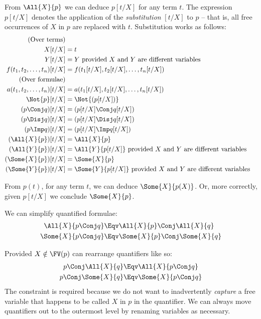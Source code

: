 \begin{itemize}
From $\All{X}{p}$ we can deduce $p[t/X]$ for any term $t$.  The
expression $p[t/X]$ denotes the application of the \emph{substitution}
$[t/X]$ to $p$ -- that is, all free occurrences of $X$ in $p$ are
replaced with $t$.  Substitution works as follows:
\begin{align*}
\text{(Over terms)} \\
X[t/X]
& = t \\
Y[t/X]
& = Y \text{ provided $X$ and $Y$ are different variables} \\
f(t_1, t_2, \ldots, t_n)[t/X]
& = f(t_1[t/X], t_2[t/X], \ldots, t_n[t/X]) \\
\text{(Over formulae)} \\
a(t_1, t_2, \ldots, t_n)[t/X]
& = a(t_1[t/X], t_2[t/X], \ldots, t_n[t/X]) \\
\Not{p}[t/X]
& = \Not{(p[t/X])} \\
(p \Conj q)[t/X]
& = (p[t/X] \Conj q[t/X]) \\
(p \Disj q)[t/X]
& = (p[t/X] \Disj q[t/X]) \\
(p \Imp q)[t/X]
& = (p[t/X] \Imp q[t/X]) \\
(\All{X}{p})[t/X]
& = \All{X}{p} \\
(\All{Y}{p})[t/X]
& = \All{Y}{p[t/X]} \text{ provided $X$ and $Y$ are different variables} \\
(\Some{X}{p})[t/X]
& = \Some{X}{p} \\
(\Some{Y}{p})[t/X]
& = \Some{Y}{p[t/X]} \text{ provided $X$ and $Y$ are different variables} \\
\end{align*}

From $p(t)$, for any term $t$, we can deduce $\Some{X}{p(X)}$.  Or, more
correctly, given $p[t/X]$ we conclude $\Some{X}{p}$.

We can simplify quantified formulae:
\begin{align*}
\All{X}{p \Conj q}
& \Eqv \All{X}{p} \Conj \All{X}{q}\\
\Some{X}{p \Conj q}
& \Eqv \Some{X}{p} \Conj \Some{X}{q}
\end{align*}

Provided $X \notin \FV(p)$ can rearrange quantifiers like so:
\begin{align*}
p \Conj \All{X}{q}
& \Eqv \All{X}{p \Conj q} \\
p \Conj \Some{X}{q}
& \Eqv \Some{X}{p \Conj q} \\
\end{align*}
The constraint is required because we do not want to inadvertently
\emph{capture} a free variable that happens to be called $X$ in $p$ in
the quantifier.  We can always move quantifiers out to the outermost
level by renaming variables as necessary.


\end{itemize}
